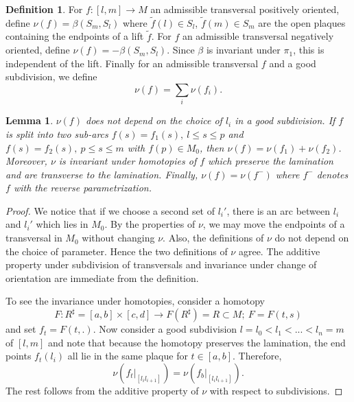\documentclass{ip-journal}
\newtheorem{lemma}[theorem]{Lemma}
\theoremstyle{definition}
\newtheorem{definition}[theorem]{Definition}
\numberwithin{equation}{section}
\begin{document}
\begin{definition}\label{MDefinition6} For $f :[l,m] \rightarrow M $ an admissible transversal positively oriented, define
$\nu(f) = \beta(S_m, S_l)$ where $\tilde f(l) \in S_l$,  $\tilde f(m) \in S_m$ are the open
plaques containing the endpoints of a lift $\tilde f$. For $f $ an admissible transversal negatively oriented, define
$\nu(f) = -\beta(S_m, S_l)$. Since $\beta$ is invariant under $\pi_1$, this is independent of the lift. 
Finally for an admissible transversal $f$ and  a good subdivision, we define 
\[
\nu(f) = \sum_i  \nu(f_i).
\]  
\end{definition}
\begin{lemma}\label{Mproposition7} $\nu(f)$ does not depend on the choice of $l_i$ in a good subdivision. If $f$ is split into two sub-arcs $f(s) = f_1(s), \ l \leq s  \leq  p$ and $f(s) = f_2(s), \  p \leq s \leq m$ with $f(p) \in M_0$, then $\nu(f) = \nu (f_1) + \nu (f_2)$. Moreover, $\nu$ is invariant under homotopies of $f$  which preserve the lamination and are transverse to the lamination. Finally, $\nu(f) = \nu(f^-)$ where $f^-$ denotes $f$ with the reverse parametrization.
\end{lemma}
\begin{proof}
 We notice that if we choose a second set of $l_i'$, there is an arc between $l_i$ and $l_i'$ which lies in $M_0$. By the properties of $ \nu$, we may move the endpoints of a transversal in $M_0$ without changing $\nu$. Also, the definitions of $\nu$ do not depend on the choice of parameter. Hence the two definitions of $\nu$ agree. The additive property under subdivision of transversals and invariance under change of orientation are immediate  from the definition. 
 
 To see the  invariance under homotopies, consider a  homotopy
 \[
 F: R^\sharp=[a,b] \times [c,d]  \rightarrow  F(R^\sharp) =R\subset M; \ F=F(t,s)
 \]
 and set $f_t=F(t,.)$. 
 Now consider a good subdivision $l =l_0 <l_1 < ...< l_n = m$  of $[l,m]$
  and note that because the homotopy preserves the lamination, the end points
  $f_t(l_i)$ all lie in the same plaque for $t \in [a,b]$.  Therefore,
  \[ 
  \nu(f_t \big |_{[l_i l_{i+1}]})=\nu(f_b \big |_{[l_i l_{i+1}]}).
  \]
  The rest follows from the additive property of $\nu$ with respect to subdivisions.
  \end{proof}
 
\end{document}
